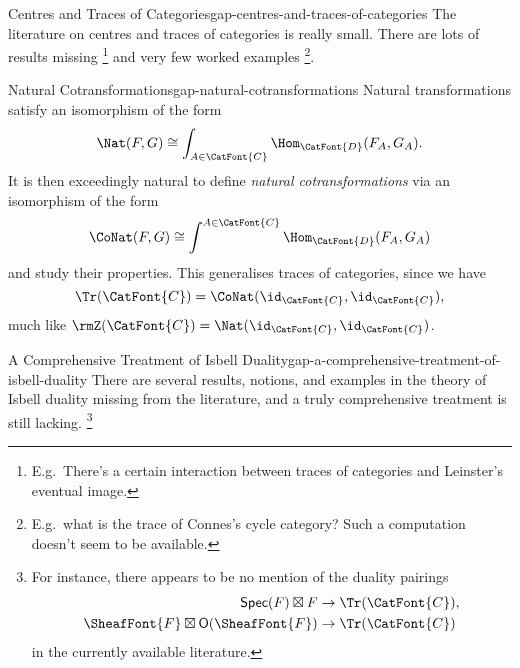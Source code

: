 \begin{gap}{Centres and Traces of Categories}{gap-centres-and-traces-of-categories}%
    The literature on centres and traces of categories is really small. There are lots of results missing%
    \footnote{%
        E.g.\ There's a certain interaction between traces of categories and Leinster's eventual image.
    } %
    and very few worked examples%
    \footnote{%
        E.g.\ what is the trace of Connes's cycle category? Such a computation doesn't seem to be available.
        \par\vspace*{\TCBBoxCorrection}
    }.%
\end{gap}
\begin{gap}{Natural Cotransformations}{gap-natural-cotransformations}%
    Natural transformations satisfy an isomorphism of the form
    \[
        \Nat(F,G)%
        \cong%
        \int_{A\in\CatFont{C}}\Hom_{\CatFont{D}}(F_{A},G_{A}).%
    \]%
    It is then exceedingly natural to define \textit{natural cotransformations} via an isomorphism of the form
    \[
        \CoNat(F,G)%
        \cong%
        \int^{A\in\CatFont{C}}\Hom_{\CatFont{D}}(F_{A},G_{A})%
    \]%
    and study their properties. This generalises traces of categories, since we have
    \[
        \Tr(\CatFont{C})%
        =%
        \CoNat(\id_{\CatFont{C}},\id_{\CatFont{C}}),
    \]%
    much like $\rmZ(\CatFont{C})=\Nat(\id_{\CatFont{C}},\id_{\CatFont{C}})$.
\end{gap}
\begin{gap}{A Comprehensive Treatment of Isbell Duality}{gap-a-comprehensive-treatment-of-isbell-duality}%
    There are several results, notions, and examples in the theory of Isbell duality missing from the literature, and a truly comprehensive treatment is still lacking.%
    \footnote{%
        For instance, there appears to be no mention of the duality pairings
        \begin{align*}
            \mathsf{Spec}(F)\boxtimes F                     &\to \Tr(\CatFont{C}),\\
            \SheafFont{F}\boxtimes\mathsf{O}(\SheafFont{F}) &\to \Tr(\CatFont{C})
        \end{align*}
        in the currently available literature.
        \par\vspace*{\TCBBoxCorrection}
    }%
\end{gap}
